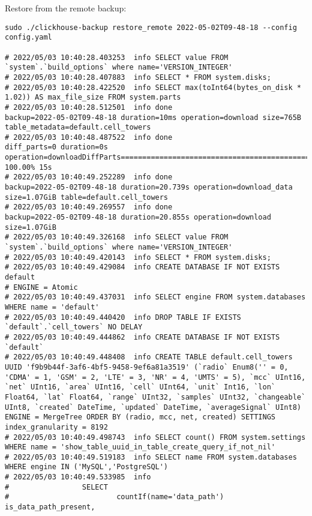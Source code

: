 Restore from the remote backup:
\begin{verbatim}
sudo ./clickhouse-backup restore_remote 2022-05-02T09-48-18 --config config.yaml

# 2022/05/03 10:40:28.403253  info SELECT value FROM `system`.`build_options` where name='VERSION_INTEGER'
# 2022/05/03 10:40:28.407883  info SELECT * FROM system.disks;
# 2022/05/03 10:40:28.422520  info SELECT max(toInt64(bytes_on_disk * 1.02)) AS max_file_size FROM system.parts
# 2022/05/03 10:40:28.512501  info done                      backup=2022-05-02T09-48-18 duration=10ms operation=download size=765B table_metadata=default.cell_towers
# 2022/05/03 10:40:48.487522  info done                      diff_parts=0 duration=0s operation=downloadDiffParts===================================================================================================================] 100.00% 15s
# 2022/05/03 10:40:49.252289  info done                      backup=2022-05-02T09-48-18 duration=20.739s operation=download_data size=1.07GiB table=default.cell_towers
# 2022/05/03 10:40:49.269557  info done                      backup=2022-05-02T09-48-18 duration=20.855s operation=download size=1.07GiB
# 2022/05/03 10:40:49.326168  info SELECT value FROM `system`.`build_options` where name='VERSION_INTEGER'
# 2022/05/03 10:40:49.420143  info SELECT * FROM system.disks;
# 2022/05/03 10:40:49.429084  info CREATE DATABASE IF NOT EXISTS default
# ENGINE = Atomic
# 2022/05/03 10:40:49.437031  info SELECT engine FROM system.databases WHERE name = 'default'
# 2022/05/03 10:40:49.440420  info DROP TABLE IF EXISTS `default`.`cell_towers` NO DELAY
# 2022/05/03 10:40:49.444862  info CREATE DATABASE IF NOT EXISTS `default`
# 2022/05/03 10:40:49.448408  info CREATE TABLE default.cell_towers UUID 'f9b9b44f-3af6-4bf5-9458-9ef6a81a3519' (`radio` Enum8('' = 0, 'CDMA' = 1, 'GSM' = 2, 'LTE' = 3, 'NR' = 4, 'UMTS' = 5), `mcc` UInt16, `net` UInt16, `area` UInt16, `cell` UInt64, `unit` Int16, `lon` Float64, `lat` Float64, `range` UInt32, `samples` UInt32, `changeable` UInt8, `created` DateTime, `updated` DateTime, `averageSignal` UInt8) ENGINE = MergeTree ORDER BY (radio, mcc, net, created) SETTINGS index_granularity = 8192
# 2022/05/03 10:40:49.498743  info SELECT count() FROM system.settings WHERE name = 'show_table_uuid_in_table_create_query_if_not_nil'
# 2022/05/03 10:40:49.519183  info SELECT name FROM system.databases WHERE engine IN ('MySQL','PostgreSQL')
# 2022/05/03 10:40:49.533985  info
#                 SELECT
#                         countIf(name='data_path') is_data_path_present,

\end{verbatim}
